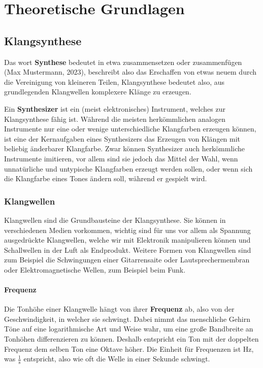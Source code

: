 \chapter{Theoretische Grundlagen}

\section{Klangsynthese}
\label{sec:org2c4084b}
Das wort \textbf{Synthese} bedeutet in etwa zusammensetzen oder zusammenfügen (Max Mustermann, 2023), beschreibt also das Erschaffen von etwas neuem durch die Vereinigung von kleineren Teilen, Klangsynthese bedeutet also, aus grundlegenden Klangwellen komplexere Klänge zu erzeugen.

Ein \textbf{Synthesizer} ist ein (meist elektronisches) Instrument, welches zur Klangsynthese fähig ist. Während die meisten herkömmlichen analogen Instrumente nur eine oder wenige unterschiedliche Klangfarben erzeugen können, ist eine der Kernaufgaben eines Synthesizers das Erzeugen von Klängen mit beliebig änderbarer Klangfarbe. Zwar können Synthesizer auch herkömmliche Instrumente imitieren, vor allem sind sie jedoch das Mittel der Wahl, wenn unnatürliche und untypische Klangfarben erzeugt werden sollen, oder wenn sich die Klangfarbe eines Tones ändern soll, während er gespielt wird.

\subsection{Klangwellen}
\label{sec:org503959d}
Klangwellen sind die Grundbausteine der Klangsynthese. Sie können in verschiedenen Medien vorkommen, wichtig sind für uns vor allem als Spannung ausgedrückte Klangwellen, welche wir mit Elektronik manipulieren können und Schallwellen in der Luft als Endprodukt. Weitere Formen von Klangwellen sind zum Beispiel die Schwingungen einer Gitarrensaite oder Lautsprechermembran oder Elektromagnetische Wellen, zum Beispiel beim Funk.

\subsubsection{Frequenz}
\label{sec:org29cf840}
Die Tonhöhe einer Klangwelle hängt von ihrer \textbf{Frequenz} ab, also von der Geschwindigkeit, in welcher sie schwingt. Dabei nimmt das menschliche Gehirn Töne auf eine logarithmische Art und Weise wahr, um eine große Bandbreite an Tonhöhen differenzieren zu können. Deshalb entspricht ein Ton mit der doppelten Frequenz dem selben Ton eine Oktave höher. Die Einheit für Frequenzen ist \si{\hertz}, was \(\frac{1}{\si{\second}}\) entspricht, also wie oft die Welle in einer Sekunde schwingt.

